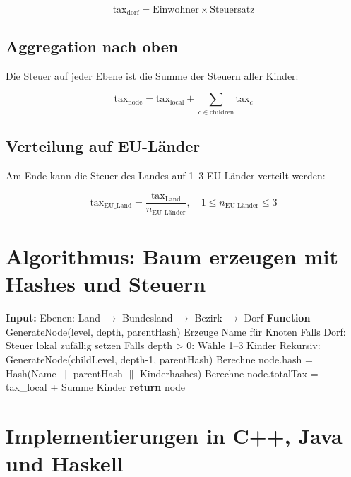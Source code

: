 \documentclass[a4paper,12pt]{article}
\begin{document}
\begin{equation}
\text{tax}_\text{dorf} = \text{Einwohner} \times \text{Steuersatz}
\end{equation}

\subsection{Aggregation nach oben}
Die Steuer auf jeder Ebene ist die Summe der Steuern aller Kinder:

\begin{equation}
\text{tax}_\text{node} = \text{tax}_\text{local} + \sum_{c \in \text{children}} \text{tax}_c
\end{equation}

\subsection{Verteilung auf EU-Länder}
Am Ende kann die Steuer des Landes auf 1--3 EU-Länder verteilt werden:

\begin{equation}
\text{tax}_\text{EU\_Land} = \frac{\text{tax}_\text{Land}}{n_\text{EU-Länder}}, \quad 1 \le n_\text{EU-Länder} \le 3
\end{equation}

\section{Algorithmus: Baum erzeugen mit Hashes und Steuern}
\begin{algorithm}
\caption{Erzeuge 3-adischen Steuerbaum mit Blockchain-Hash}
\begin{algorithmic}[1]
\STATE \textbf{Input:} Ebenen: Land $\rightarrow$ Bundesland $\rightarrow$ Bezirk $\rightarrow$ Dorf
\STATE \textbf{Function} GenerateNode(level, depth, parentHash)
\STATE \quad Erzeuge Name für Knoten
\STATE \quad Falls Dorf: Steuer lokal zufällig setzen
\STATE \quad Falls depth > 0:
\STATE \quad \quad Wähle 1--3 Kinder
\STATE \quad \quad Rekursiv: GenerateNode(childLevel, depth-1, parentHash)
\STATE \quad Berechne node.hash = Hash(Name $\|$ parentHash $\|$ Kinderhashes)
\STATE \quad Berechne node.totalTax = tax\_local + Summe Kinder
\STATE \quad \textbf{return} node
\end{algorithmic}
\end{algorithm}

\section{Implementierungen in C++, Java und Haskell}
\end{document}
